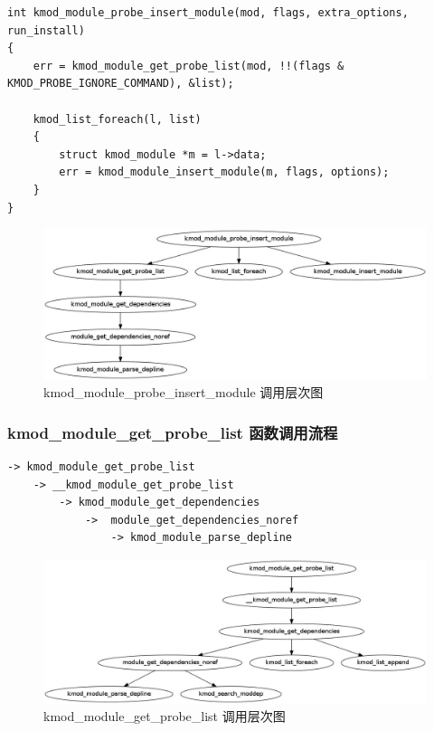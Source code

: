 \documentclass[11pt,a4paper]{article}
\makeatletter
\def\maxwidth{\ifdim\Gin@nat@width>\linewidth\linewidth
\else\Gin@nat@width\fi}
\let\Oldincludegraphics\includegraphics
\renewcommand{\includegraphics}[1]{\Oldincludegraphics[width=\maxwidth]{#1}}
\makeatother
\begin{document}
{\begin{shaded}\begin{verbatim}
int kmod_module_probe_insert_module(mod, flags, extra_options, run_install)
{
    err = kmod_module_get_probe_list(mod, !!(flags & KMOD_PROBE_IGNORE_COMMAND), &list);

    kmod_list_foreach(l, list) 
    {
        struct kmod_module *m = l->data;
        err = kmod_module_insert_module(m, flags, options);
    }
}
\end{verbatim}\end{shaded}}
\begin{figure}[htbp]
\centering
\includegraphics{./figures/kmod_module_probe_insert_module.jpg}
\caption{kmod\_module\_probe\_insert\_module 调用层次图}
\end{figure}

\subsubsection{kmod\_module\_get\_probe\_list 函数调用流程}

{\begin{shaded}\begin{verbatim}
-> kmod_module_get_probe_list
    -> __kmod_module_get_probe_list
        -> kmod_module_get_dependencies
            ->  module_get_dependencies_noref
                -> kmod_module_parse_depline
\end{verbatim}\end{shaded}}
\begin{figure}[htbp]
\centering
\includegraphics{./figures/kmod_module_get_probe_list.jpg}
\caption{kmod\_module\_get\_probe\_list 调用层次图}
\end{figure}
\end{document}
